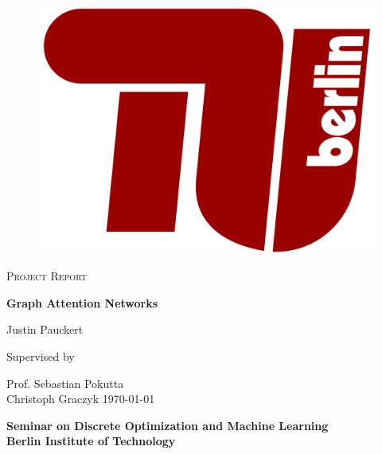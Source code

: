 \begin{titlepage}
    \begin{center}
        \vspace*{0cm}
        
        \begin{figure}[h]
        \begin{center}
        \includegraphics[width=.3\columnwidth]{img/logo.png}
        \end{center}
        \end{figure}
        \vspace*{1cm}
        
        \LARGE
        \textsc{Project Report}
        \vspace{1cm}
                
        \Huge
        \textbf{Graph Attention Networks}
        \vspace{1.5cm}
        
        \LARGE
        Justin Pauckert
        \vspace{1.5cm}
        
        \large 
        Supervised by
        \vspace{.5cm}
        
        \Large 
        Prof. Sebastian Pokutta\\
        Christoph Graczyk
        \vspace{.2cm}
        \vfill
        {\small \monthyeardate\today}
        
        \vspace{1cm}       
        {\Large \textbf{
            Seminar on Discrete Optimization and Machine Learning \\
            Berlin Institute of Technology
            }
        }    
    \end{center}
\end{titlepage}